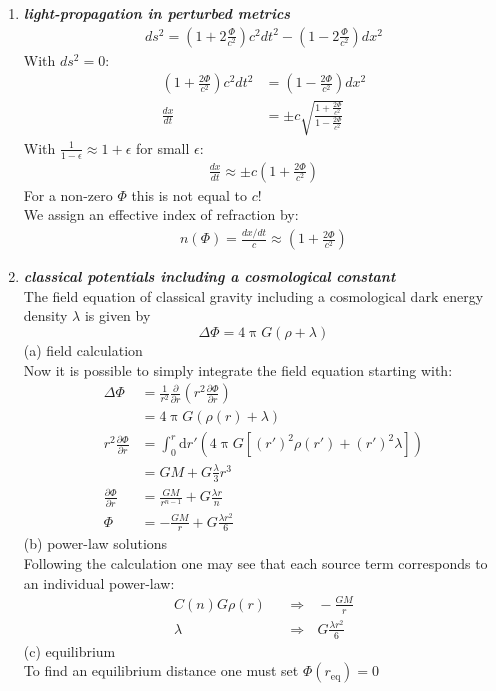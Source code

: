 \documentclass[a4paper,12pt]{article}
\newcommand{\question}[1]{\textbf{\textit{#1}}}
\renewcommand{\pi}{\uppi}
\begin{document}
\begin{enumerate}
		
		\item \question{light-propagation in perturbed metrics}\\
		\begin{align}
		ds^2=\left(1+2\frac{\Phi}{c^2}\right)c^2dt^2-\left(1-2\frac{\Phi}{c^2}\right)dx^2 
		\end{align}
		With $ds^2=0$:
		\begin{align}
		\left( 1+\frac{2\Phi}{c^2}\right)c^2dt^2 &= \left(1-\frac{2\Phi}{c^2}\right) dx^2\\
		\frac{dx}{dt}&=\pm c\sqrt{\frac{1+\frac{2\Phi}{c^2}}{1-\frac{2\Phi}{c^2}}}
		\end{align}
		With $\frac{1}{1-\epsilon}\approx 1+\epsilon$ for small $\epsilon$:
		\begin{align}
		\frac{dx}{dt}\approx\pm c\left(1+\frac{2\Phi}{c^2}\right)
		\end{align} 
		For a non-zero $\Phi$ this is not equal to $c$! \\
		We assign an effective index of refraction by:
		\begin{align}
		n(\Phi)=\frac{dx/dt}{c}\approx \left(1+\frac{2\Phi}{c^2}\right)
		\end{align}
		
		\item \question{classical potentials including a cosmological constant}\\
		The field equation of classical gravity including a
                cosmological dark energy density $\lambda$ is given by
		\begin{equation}
		\Delta\Phi = 4\pi G(\rho + \lambda)
		\end{equation}
		(a) field calculation\\
	
		Now it is possible to simply integrate the field equation starting with:
		\begin{align}
		  \Delta\Phi&=\frac{1}{r^{2}}\frac{\partial}{\partial r}\left(r^{2}\frac{\partial\Phi}{\partial r}\right)\\
		  &=4\pi G(\rho(r)+\lambda)\\
		  r^{2}\frac{\partial\Phi}{\partial
                    r}&=\int_0^r\textrm{d}r'\left(4\pi G[\left(r'\right)^{2}\rho\left(r'\right)+\left(r'\right)^{2}\lambda]\right)\\
		  &=GM+G\frac{\lambda}{3}r^3\\
		  \frac{\partial\Phi}{\partial r}&=\frac{GM}{r^{n-1}}+G\frac{\lambda r}{n}\\
		  \Phi&=-\frac{GM}{r}+G\frac{\lambda r^2}{6}
		\end{align}
		(b) power-law solutions\\
		Following the calculation one may see that each source term corresponds to an individual power-law:
		\begin{align*}
		  C(n)G\rho(r) ~~~ &\Rightarrow ~~~ -\frac{GM}{r}\\
		  \lambda ~~~ &\Rightarrow ~~~ G\frac{\lambda r^2}{6}
		\end{align*}
		(c) equilibrium\\
		To find an equilibrium distance one must set \(\Phi\left(r_\textrm{eq}\right)=0\)
		\end{enumerate}
\end{document}
